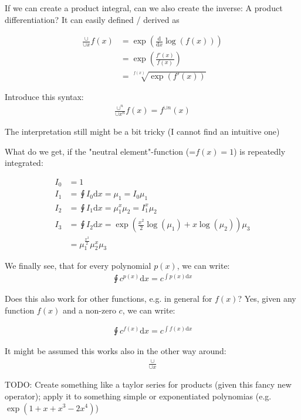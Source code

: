\documentclass{article}
\begin{document}
If we can create a product integral, can we also create the inverse: A product differentiation? It can easily defined / derived as

\begin{align}
    \frac{\mathrm{\cup}}{\mathrm{\cup}x}f(x)&=\exp\left(\frac{\mathrm{d}}{\mathrm{d}x}\log(f(x))\right)\\
    &=\exp\left(\frac{f'(x)}{f(x)}\right)\\
    &=\sqrt[f(x)]{\exp(f'(x))}
\end{align}

Introduce this syntax:
\begin{align}
    \frac{\mathrm{\cup}^n}{\mathrm{\cup}x^n}f(x)=f^{\cup n}(x)
\end{align}

The interpretation still might be a bit tricky (I cannot find an intuitive one)

What do we get, if the "neutral element"-function (=$f(x)=1$) is repeatedly integrated:

\begin{align}
    I_0 &= 1\\
    I_1 &= \intcup I_0 \mathrm{d}x= \mu_1 = I_0\mu_1 \\
    I_2 &= \intcup I_1 \mathrm{d}x = \mu_1^x\mu_2 = I_1^x\mu_2\\
    I_3 &= \intcup I_2 \mathrm{d}x = \exp\left(\frac{x^2}{2}\log(\mu_1)+x\log(\mu_2)\right)\mu_3\\
    &= \mu_1^{\frac{x^2}{2}}\mu_2^x\mu_3
\end{align}

We finally see, that for every polynomial $p(x)$, we can write:
\begin{align}
    \intcup c^{p(x)} \mathrm{d}x = c^{\int p(x) \mathrm{d}x}
\end{align}

Does this also work for other functions, e.g. in general for $f(x)$? Yes, given any function $f(x)$ and a non-zero $c$, we can write:

\begin{align}
   \intcup c^{f(x)} \mathrm{d}x = c^{\int f(x) \mathrm{d}x}
\end{align}

It might be assumed this works also in the other way around:
\begin{align}
    \frac{\mathrm{\cup}}{\mathrm{\cup}x}
\end{align}

TODO: Create something like a taylor series for products (given this fancy new operator); apply it to something simple or exponentiated polynomias (e.g. $\exp(1+x+x^3-2x^4)$)
\end{document}
